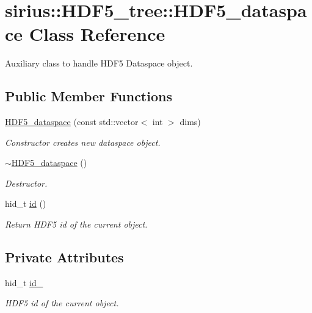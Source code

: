 \hypertarget{classsirius_1_1_h_d_f5__tree_1_1_h_d_f5__dataspace}{}\section{sirius\+:\+:H\+D\+F5\+\_\+tree\+:\+:H\+D\+F5\+\_\+dataspace Class Reference}
\label{classsirius_1_1_h_d_f5__tree_1_1_h_d_f5__dataspace}


Auxiliary class to handle H\+D\+F5 Dataspace object.  


\subsection*{Public Member Functions}
\begin{DoxyCompactItemize}
\item 
\hyperlink{classsirius_1_1_h_d_f5__tree_1_1_h_d_f5__dataspace_a1d33c755114aa2b44b00fd4ba8483c8d}{H\+D\+F5\+\_\+dataspace} (const std\+::vector$<$ int $>$ dims)
\begin{DoxyCompactList}\small\item\em Constructor creates new dataspace object. \end{DoxyCompactList}\item 
\hyperlink{classsirius_1_1_h_d_f5__tree_1_1_h_d_f5__dataspace_ac0b37d5fd090636b5a3d998b235469bb}{$\sim$\+H\+D\+F5\+\_\+dataspace} ()
\begin{DoxyCompactList}\small\item\em Destructor. \end{DoxyCompactList}\item 
hid\+\_\+t \hyperlink{classsirius_1_1_h_d_f5__tree_1_1_h_d_f5__dataspace_a7ab7d5e18e65bd7320b837d31565d199}{id} ()
\begin{DoxyCompactList}\small\item\em Return H\+D\+F5 id of the current object. \end{DoxyCompactList}\end{DoxyCompactItemize}
\subsection*{Private Attributes}
\begin{DoxyCompactItemize}
\item 
hid\+\_\+t \hyperlink{classsirius_1_1_h_d_f5__tree_1_1_h_d_f5__dataspace_a42614a5d0b9e4c985cce89a32d484c5a}{id\+\_\+}
\begin{DoxyCompactList}\small\item\em H\+D\+F5 id of the current object. \end{DoxyCompactList}\end{DoxyCompactItemize}


